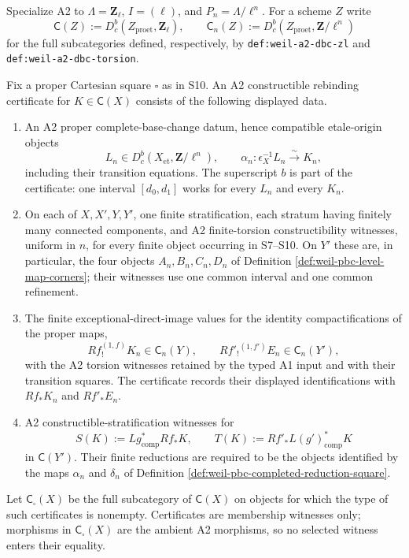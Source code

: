 \begin{definition}
\label{def:weil-pbc-a2-constructible-rebind}
Specialize A2 to $\Lambda=\mathbf Z_\ell$, $I=(\ell)$, and
$P_n=\Lambda/\ell^n$.  For a scheme $Z$ write
\[
 \mathsf C(Z):=D^b_c(Z_{\mathrm{proet}},\mathbf Z_\ell),
 \qquad
 \mathsf C_n(Z):=D^b_c(Z_{\mathrm{proet}},\mathbf Z/\ell^n)
\]
for the full subcategories defined, respectively, by
\texttt{def:weil-a2-dbc-zl} and \texttt{def:weil-a2-dbc-torsion}.

Fix a proper Cartesian square $\square$ as in S10.  An A2 constructible
rebinding certificate for $K\in\mathsf C(X)$ consists of the following
displayed data.
\begin{enumerate}
\item An A2 proper complete-base-change datum, hence compatible etale-origin
      objects
      \[
       L_n\in D^b_c(X_{\mathrm{et}},\mathbf Z/\ell^n),\qquad
       \alpha_n:\epsilon_X^{-1}L_n\xrightarrow{\sim}K_n,
      \]
      including their transition equations.  The superscript $b$ is part of
      the certificate: one interval $[d_0,d_1]$ works for every $L_n$ and
      every $K_n$.
\item On each of $X,X',Y,Y'$, one finite stratification, each stratum having
      finitely many connected components, and A2 finite-torsion
      constructibility witnesses, uniform in $n$, for every finite object
      occurring in S7--S10.  On $Y'$ these are, in particular, the four
      objects $A_n,B_n,C_n,D_n$ of Definition
      \ref{def:weil-pbc-level-map-corners}; their witnesses use one common
      interval and one common refinement.
\item The finite exceptional-direct-image values for the identity
      compactifications of the proper maps,
      \[
       Rf_!^{(1,f)}K_n\in\mathsf C_n(Y),\qquad
       Rf'_!{}^{(1,f')}E_n\in\mathsf C_n(Y'),
      \]
      with the A2 torsion witnesses retained by the typed A1 input and with
      their transition squares.  The certificate records their displayed
      identifications with $Rf_*K_n$ and $Rf'_*E_n$.
\item A2 constructible-stratification witnesses for
      \[
       S(K):=Lg^*_{\mathrm{comp}}Rf_*K,
       \qquad
       T(K):=Rf'_*L(g')^*_{\mathrm{comp}}K
      \]
      in $\mathsf C(Y')$.  Their finite reductions are required to be the
      objects identified by the maps $\alpha_n$ and $\delta_n$ of Definition
      \ref{def:weil-pbc-completed-reduction-square}.
\end{enumerate}
Let $\mathsf C_\square(X)$ be the full subcategory of $\mathsf C(X)$ on
objects for which the type of such certificates is nonempty.  Certificates
are membership witnesses only; morphisms in $\mathsf C_\square(X)$ are the
ambient A2 morphisms, so no selected witness enters their equality.
\end{definition}

